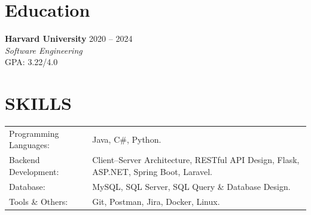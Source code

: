 \documentclass[11pt]{article}
\begin{document}
\section*{Education}
\textbf{Harvard University} \hfill 2020 -- 2024 \\
\textit{Software Engineering} \\ 
{GPA: 3.22/4.0}


\section*{SKILLS}

\begin{tabular}{ @{}l p{12cm} }
Programming Languages: & Java, C\#, Python. \\
Backend Development: & Client--Server Architecture, RESTful API Design,
                            Flask, ASP.NET, Spring Boot, Laravel. \\
Database: & MySQL, SQL Server, SQL Query \& Database Design. \\
Tools \& Others: & Git, Postman, Jira, Docker, Linux. \\
\end{tabular}
\end{document}
